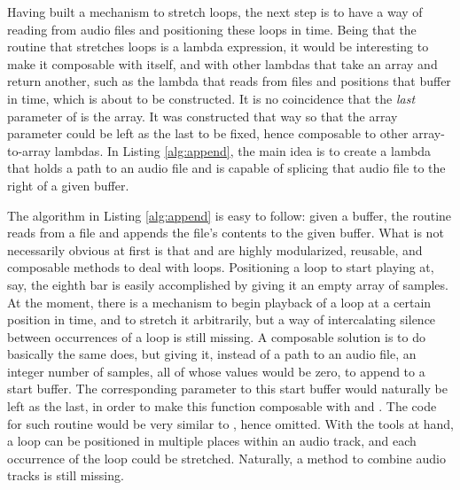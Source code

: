 Having built a mechanism to stretch loops, the next step is to have a way of reading from audio files and positioning these loops in time. Being that the routine that stretches loops is a lambda expression, it would be interesting to make it composable with itself, and with other lambdas that take an array and return another, such as the lambda that reads from files and positions that buffer in time, which is about to be constructed. It is no coincidence that the \emph{last} parameter of  is the array. It was constructed that way so that the array parameter could be left as the last to be fixed, hence composable to other array-to-array lambdas. In Listing \ref{alg:append}, the main idea is to create a lambda that holds a path to an audio file and is capable of splicing that audio file to the right of a given buffer.

The algorithm in Listing \ref{alg:append} is easy to follow: given a  buffer, the routine reads from a file and appends the file's contents to the given buffer. What is not necessarily obvious at first is that  and  are highly modularized, reusable, and composable methods to deal with loops. Positioning a loop to start playing at, say, the eighth bar is easily accomplished by giving it an empty array of  samples. At the moment, there is a mechanism to begin playback of a loop at a certain position in time, and to stretch it arbitrarily, but a way of intercalating silence between occurrences of a loop is still missing. A composable solution is to do basically the same  does, but giving it, instead of a path to an audio file, an integer number of samples, all of whose values would be zero, to append to a start buffer. The corresponding parameter to this start buffer would naturally be left as the last, in order to make this function composable with  and . The code for such  routine would be very similar to , hence omitted. With the tools at hand, a loop can be positioned in multiple places within an audio track, and each occurrence of the loop could be stretched. Naturally, a method to combine audio tracks is still missing.


